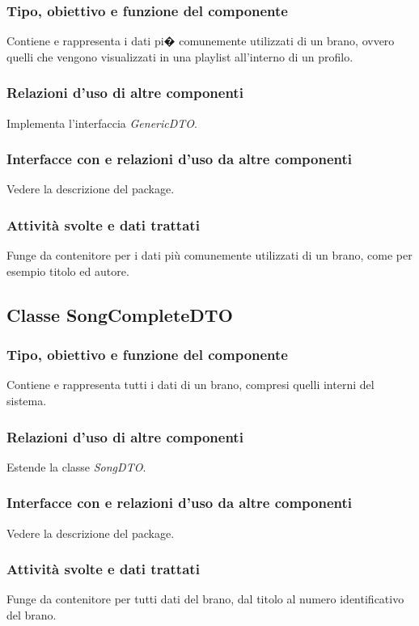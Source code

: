 \subsubsection*{Tipo, obiettivo e funzione del componente}
Contiene e rappresenta i dati pi� comunemente utilizzati di un brano, ovvero
quelli che vengono visualizzati in una playlist all'interno di un profilo.
\subsubsection*{Relazioni d'uso di altre componenti}
Implementa l'interfaccia \textit{GenericDTO}.
\subsubsection*{Interfacce con e relazioni d'uso da altre componenti}
Vedere la descrizione del package.
\subsubsection*{Attivit\`a svolte e dati trattati}
Funge da contenitore per i dati pi\`u comunemente utilizzati di un brano, come
per esempio titolo ed autore.

\subsection{Classe SongCompleteDTO}
\subsubsection*{Tipo, obiettivo e funzione del componente}
Contiene e rappresenta tutti i dati di un brano, compresi quelli interni del
sistema. 
\subsubsection*{Relazioni d'uso di altre componenti}
Estende la classe \textit{SongDTO}.
\subsubsection*{Interfacce con e relazioni d'uso da altre componenti}
Vedere la descrizione del package.
\subsubsection*{Attivit\`a svolte e dati trattati}
Funge da contenitore per tutti dati del brano, dal titolo al numero
identificativo del brano. 

